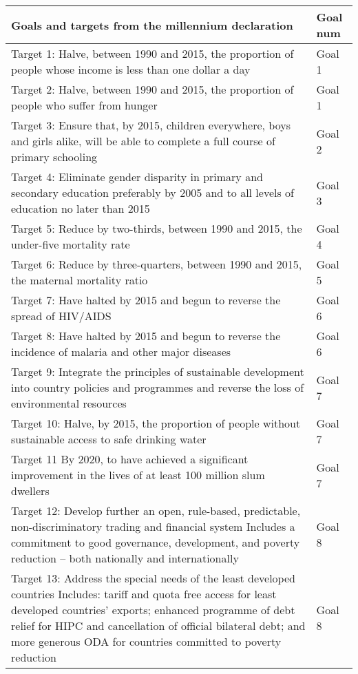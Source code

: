 \documentclass[
  openany]{book}
\begin{document}
\begin{longtable}{>{\raggedright\arraybackslash}p{33em}l}
\toprule
Goals and targets from the millennium declaration & Goal num\\
\midrule
Target 1:   Halve, between 1990 and 2015, the proportion of people whose income is less than one dollar a day & Goal 1\\
Target 2: Halve, between 1990 and 2015, the proportion of people who suffer from hunger & Goal 1\\
Target 3:   Ensure that, by 2015, children everywhere, boys and girls alike, will be able to complete a full course of primary schooling & Goal 2\\
Target 4:   Eliminate gender disparity in primary and secondary education preferably by 2005 and to all levels of education no later than 2015 & Goal 3\\
Target 5:   Reduce by two-thirds, between 1990 and 2015, the under-five mortality rate & Goal 4\\
\addlinespace
Target 6:   Reduce by three-quarters, between 1990 and 2015, the maternal mortality ratio & Goal 5\\
Target 7:   Have halted by 2015 and begun to reverse the spread of HIV/AIDS & Goal 6\\
Target 8:   Have halted by 2015 and begun to reverse the incidence of malaria and other major diseases & Goal 6\\
Target 9:   Integrate the principles of sustainable development into country policies and programmes and reverse the loss of environmental resources & Goal 7\\
Target 10: Halve, by 2015, the proportion of people without sustainable access to safe drinking water & Goal 7\\
\addlinespace
Target 11 By 2020, to have achieved a significant improvement in the lives of at least 100 million slum dwellers & Goal 7\\
Target 12: Develop further an open, rule-based, predictable, non-discriminatory trading and financial system
Includes a commitment to good governance, development, and poverty reduction – both nationally and internationally & Goal 8\\
Target 13: Address the special needs of the least developed countries
Includes: tariff and quota free access for least developed countries' exports; enhanced programme of debt relief for HIPC and cancellation of official bilateral debt; and more generous ODA for countries committed to poverty reduction & Goal 8\\

\end{longtable}
\end{document}
